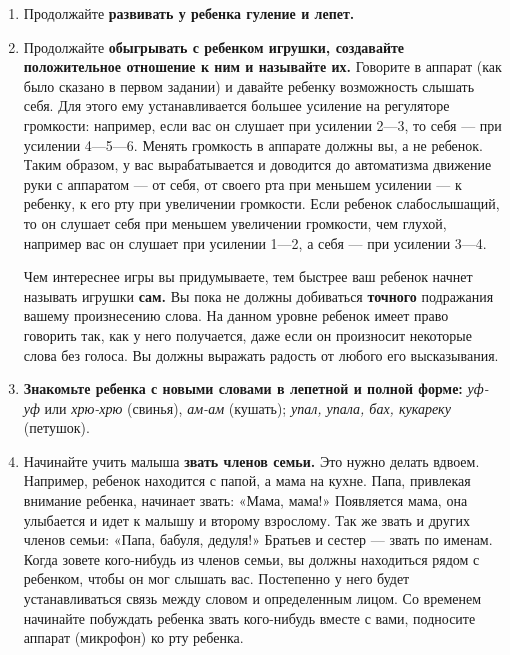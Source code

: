 \documentclass{book}
\renewcommand{\emph}[1]{\textit{#1}}
\begin{document}
\begin{enumerate}
\def\labelenumi{\arabic{enumi}.}
\item
  
  Продолжайте \textbf{развивать у ребенка гуление и лепет.}
  
\item
  
  Продолжайте \textbf{обыгрывать с ребенком игрушки, создавайте
  положительное отношение к ним и называйте их.} Говорите в аппарат (как
  было сказано в первом задании) и давайте ребенку возможность слышать
  себя. Для этого ему устанавливается большее усиление на регуляторе
  громкости: например, если вас он слушает при усилении 2---3, то себя
  --- при усилении 4---5---6. Менять громкость в аппарате должны вы, а
  не ребенок. Таким образом, у вас вырабатывается и доводится до
  автоматизма движение руки с аппаратом --- от себя, от своего рта при
  меньшем усилении --- к ребенку, к его рту при увеличении громкости.
  Если ребенок слабослышащий, то он слушает себя при меньшем увеличении
  громкости, чем глухой, например вас он слушает при усилении 1---2, а
  себя --- при усилении 3---4.


Чем интереснее игры вы придумываете, тем быстрее ваш ребенок начнет
называть игрушки \textbf{сам.} Вы пока не должны добиваться
\textbf{точного} подражания вашему произнесению слова. На данном уровне
ребенок имеет право говорить так, как у него получается, даже если он
произносит некоторые слова без голоса. Вы должны выражать радость от
любого его высказывания.


\item
  
  \textbf{Знакомьте ребенка с новыми словами в лепетной и полной форме:}
  \emph{уф-уф} или \emph{хрю-хрю} (свинья), \emph{ам-ам} (кушать);
  \emph{упал, упала, бах, кукареку} (петушок).
  
\item
  
  Начинайте учить малыша \textbf{звать членов семьи.} Это нужно делать
  вдвоем. Например, ребенок находится с папой, а мама на кухне. Папа,
  привлекая внимание ребенка, начинает звать: «Мама, мама!» Появляется
  мама, она улыбается и идет к малышу и второму взрослому. Так же звать
  и других членов семьи: «Папа, бабуля, дедуля!» Братьев и сестер ---
  звать по именам. Когда зовете кого-нибудь из членов семьи, вы должны
  находиться рядом с ребенком, чтобы он мог слышать вас. Постепенно у
  него будет устанавливаться связь между словом и определенным лицом. Со
  временем начинайте побуждать ребенка звать кого-нибудь вместе с вами,
  подносите аппарат (микрофон) ко рту ребенка.
  
\end{enumerate}
\end{document}
